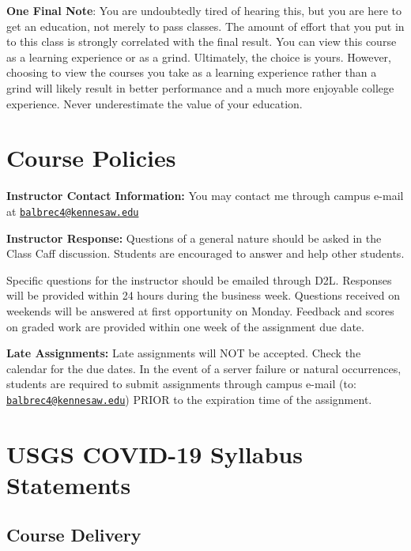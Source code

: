 \documentclass[11pt,]{article}
\begin{document}
\textbf{One Final Note}: You are undoubtedly tired of hearing this, but you are here to get an education, not merely
to pass classes. The amount of effort that you put in to this class is strongly correlated with the final result. You can view this course as a learning experience or as a grind. Ultimately, the choice is yours. However, choosing to
view the courses you take as a learning experience rather than a grind will likely result in better performance and
a much more enjoyable college experience. Never underestimate the value of your education.

\hypertarget{course-policies}{%
\section{Course Policies}\label{course-policies}}

\textbf{Instructor Contact Information:} You may contact me through campus e-mail at \href{mailto:balbrec4@kennesaw.edu}{\nolinkurl{balbrec4@kennesaw.edu}}

\textbf{Instructor Response:} Questions of a general nature should be asked in the Class Caff discussion.
Students are encouraged to answer and help other students.

Specific questions for the instructor should be emailed through D2L. Responses will be provided within 24 hours during the business week. Questions received on weekends will be answered at first opportunity on Monday. Feedback and scores on graded work are provided within one week of the assignment due date.

\textbf{Late Assignments:} Late assignments will NOT be accepted. Check the calendar for the due dates. In the event of a
server failure or natural occurrences, students are required to submit assignments through campus e-mail (to:
\href{mailto:balbrec4@kennesaw.edu}{\nolinkurl{balbrec4@kennesaw.edu}}) PRIOR to the expiration time of the assignment.

\newpage

\hypertarget{usgs-covid-19-syllabus-statements}{%
\section{USGS COVID-19 Syllabus Statements}\label{usgs-covid-19-syllabus-statements}}

\hypertarget{course-delivery}{%
\subsection{Course Delivery}\label{course-delivery}}
\end{document}
